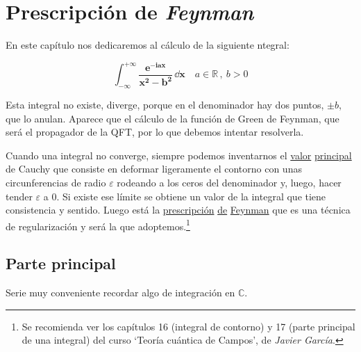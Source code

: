 \chapter{Prescripción de \emph{Feynman}}
\label{T38}

\vspace{10mm}
\begin{adjustwidth}{50pt}{50pt}
\begin{ejemplo}
\vspace{2mm}

En este capítulo nos dedicaremos al cálculo de la siguiente ntegral:

$$\boldsymbol { \displaystyle \int_{-\infty}^{+\infty} \dfrac{e^{-iax}}{x^2-b^2}  \, \dd x} \quad a\in \mathbb R\, , \ b>0$$

Esta integral no existe, diverge, porque en el denominador hay dos puntos, $\pm b$, que lo anulan. Aparece que el cálculo de la función de Green de Feynman, que será el propagador de la QFT, por lo que debemos intentar resolverla.

Cuando una integral no converge, siempre podemos inventarnos el \underline{valor} \underline{principal} de Cauchy que consiste en deformar ligeramente el contorno con unas circunferencias de radio $\varepsilon$ rodeando a los ceros del denominador y, luego, hacer tender $\varepsilon$ a $0$. Si existe ese límite se obtiene un valor de la integral que tiene consistencia y sentido.
Luego está la \underline{prescripción} \underline{de} \underline{Feynman} que es una técnica de regularización y será la que adoptemos.\footnote{Se recomienda ver los capítulos 16 (integral de contorno) y 17 (parte principal de una integral) del curso `Teoría cuántica de Campos', de \emph{Javier García}.}
\vspace{2mm}
\end{ejemplo}
\end{adjustwidth}

\vspace{5mm}

\section{Parte principal}

\textcolor{gris}{Serie muy conveniente recordar algo de integración en $\mathbb C$.}

